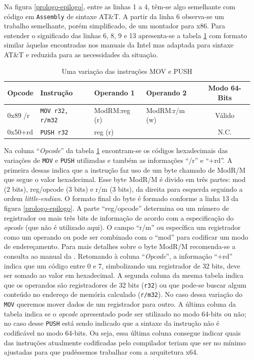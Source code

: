 Na figura \ref{prologo-epilogo}, entre as linhas 1 a 4, têm-se algo
semelhante com código em \texttt{Assembly} de sintaxe
AT\&T. A partir da linha 6 observa-se um trabalho semelhante, porém
simplificado, de um montador para x86. Para entender o significado das
linhas 6, 8, 9 e 13 apresenta-se a tabela \ref{mov-push-1} com formato
similar àquelas encontradas nos  manuais da Intel
\cite{intel_aam}\cite{intel_naz} mas
adaptada para sintaxe AT\&T e reduzida para as necessidades da situação.

\begin{table}
  \caption{Uma variação das instruções MOV e PUSH\label{mov-push-1}}
  \centering
  \begin{tabular}{l l l l c}
    \toprule
    Opcode  & Instrução     & Operando 1    & Operando 2    &  Modo 64-Bits \\
    \midrule
    0x89 /r & \verb!MOV r32, r/m32!& ModRM:reg (r) & ModRM:r/m (w) &  Válido       \\
    0x50+rd & \verb!PUSH r32!      & reg (r)       &               &  N.C.         \\
    \bottomrule
  \end{tabular}
\end{table}

Na coluna ``\textit{Opcode}'' da tabela \ref{mov-push-1} encontram-se
os códigos hexadecimais das variações de \verb!MOV! e \verb!PUSH!
utilizadas e também as informações ``/r'' e ``+rd''. A primeira dessas
indica que a instrução faz uso de um byte chamado de ModR/M que segue
o valor hexadecimal. Esse byte ModR/M é divido em três partes: mod (2 bits),
reg/opcode (3 bits) e r/m (3 bits), da direita para esquerda seguindo
a ordem \textit{little-endian}. O formato final do byte é formado conforme
a linha 13 da figura \ref{prologo-epilogo}.
A parte ``reg/opcode'' determina ou um
número de registrador ou mais três bits de informação de acordo com
a especificação do \textit{opcode} (que não é utilizado aqui). O campo
``r/m'' ou específica um registrador como um operando ou pode ser
combinado com o ``mod'' para codificar um modo de endereçamento. Para
mais detalhes sobre o byte ModR/M recomenda-se a consulta ao manual da
. Retomando à coluna
``\textit{Opcode}'', a informação ``+rd'' indica que um código entre 0
e 7, simbolizando um registrador de 32 bits, deve ser somado ao valor
em hexadecimal. A segunda coluna da mesma tabela indica que os operandos são
registradores de 32 bits (\verb!r32!) ou que pode-se buscar algum
conteúdo no endereço de memória calculado (\verb!r/m32!). No
caso dessa variação do \verb!MOV! queremos mover dados de um
registrador para outro. A última coluna da tabela indica se o
\textit{opcode} apresentado pode ser utilizado no modo 64-bits ou não;
no caso desse \verb!PUSH! está sendo indicado que a sintaxe da instrução
não é codificável no modo 64-bits. Ou seja, essa última coluna
consegue indicar quais das instruções atualmente codificadas pelo
compilador teriam que ser no mínimo ajustadas para que pudéssemos
trabalhar com a arquitetura x64.


